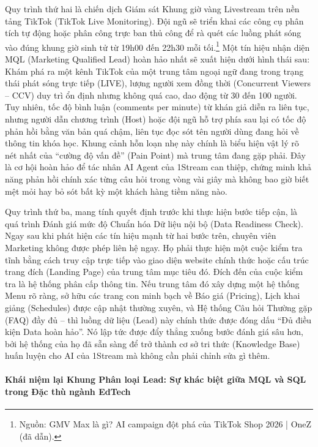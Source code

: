 Quy trình thứ hai là chiến dịch Giám sát Khung giờ vàng Livestream trên nền tảng TikTok (TikTok Live Monitoring). Đội ngũ sẽ triển khai các công cụ phân tích tự động hoặc phân công trực ban thủ công để rà quét các luồng phát sóng vào đúng khung giờ sinh tử từ 19h00 đến 22h30 mỗi tối.\footnote{Nguồn: GMV Max là gì? AI campaign đột phá của TikTok Shop 2026 | OneZ (đã dẫn).} Một tín hiệu nhận diện MQL (Marketing Qualified Lead) hoàn hảo nhất sẽ xuất hiện dưới hình thái sau: Khám phá ra một kênh TikTok của một trung tâm ngoại ngữ đang trong trạng thái phát sóng trực tiếp (LIVE), lượng người xem đồng thời (Concurrent Viewers -- CCV) duy trì ổn định nhưng không quá cao, dao động từ 30 đến 100 người. Tuy nhiên, tốc độ bình luận (comments per minute) từ khán giả diễn ra liên tục, nhưng người dẫn chương trình (Host) hoặc đội ngũ hỗ trợ phía sau lại có tốc độ phản hồi bằng văn bản quá chậm, liên tục đọc sót tên người dùng đang hỏi về thông tin khóa học. Khung cảnh hỗn loạn nhẹ này chính là biểu hiện vật lý rõ nét nhất của ``cường độ vấn đề'' (Pain Point) mà trung tâm đang gặp phải. Đây là cơ hội hoàn hảo để tác nhân AI Agent của 1Stream can thiệp, chứng minh khả năng phản hồi chính xác từng câu hỏi trong vòng vài giây mà không bao giờ biết mệt mỏi hay bỏ sót bất kỳ một khách hàng tiềm năng nào.

Quy trình thứ ba, mang tính quyết định trước khi thực hiện bước tiếp cận, là quá trình Đánh giá mức độ Chuẩn hóa Dữ liệu nội bộ (Data Readiness Check). Ngay sau khi phát hiện các tín hiệu mạnh từ hai bước trên, chuyên viên Marketing không được phép liên hệ ngay. Họ phải thực hiện một cuộc kiểm tra tĩnh bằng cách truy cập trực tiếp vào giao diện website chính thức hoặc cấu trúc trang đích (Landing Page) của trung tâm mục tiêu đó. Đích đến của cuộc kiểm tra là hệ thống phân cấp thông tin. Nếu trung tâm đó xây dựng một hệ thống Menu rõ ràng, sở hữu các trang con minh bạch về Báo giá (Pricing), Lịch khai giảng (Schedules) được cập nhật thường xuyên, và Hệ thống Câu hỏi Thường gặp (FAQ) đầy đủ -- thì luồng dữ liệu (Lead) này chính thức được đóng dấu ``Đủ điều kiện Data hoàn hảo''. Nó lập tức được đẩy thẳng xuống bước đánh giá sâu hơn, bởi hệ thống của họ đã sẵn sàng để trở thành cơ sở tri thức (Knowledge Base) huấn luyện cho AI của 1Stream mà không cần phải chỉnh sửa gì thêm.

\paragraph{Khái niệm lại Khung Phân loại Lead: Sự khác biệt giữa MQL và SQL trong Đặc thù ngành EdTech}

